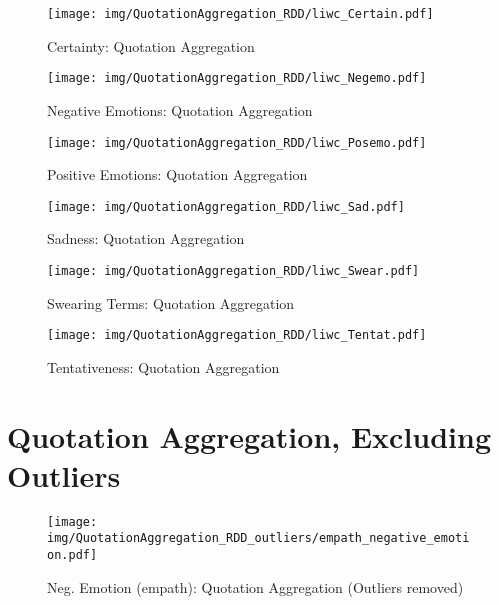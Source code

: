 \begin{figure}[h]\centering
\texttt{[image: img/QuotationAggregation\_RDD/liwc\_Certain.pdf]}
\caption{Certainty: Quotation Aggregation}
\label{fig: qa_Certainty}
\end{figure}

\begin{figure}[h]\centering
\texttt{[image: img/QuotationAggregation\_RDD/liwc\_Negemo.pdf]}
\caption{Negative Emotions: Quotation Aggregation}
\label{fig: qa_Negative Emotions}
\end{figure}

\begin{figure}[h]\centering
\texttt{[image: img/QuotationAggregation\_RDD/liwc\_Posemo.pdf]}
\caption{Positive Emotions: Quotation Aggregation}
\label{fig: qa_Positive Emotions}
\end{figure}

\begin{figure}[h]\centering
\texttt{[image: img/QuotationAggregation\_RDD/liwc\_Sad.pdf]}
\caption{Sadness: Quotation Aggregation}
\label{fig: qa_Sadness}
\end{figure}

\begin{figure}[h]\centering
\texttt{[image: img/QuotationAggregation\_RDD/liwc\_Swear.pdf]}
\caption{Swearing Terms: Quotation Aggregation}
\label{fig: qa_Swearing Terms}
\end{figure}

\begin{figure}[h]\centering
\texttt{[image: img/QuotationAggregation\_RDD/liwc\_Tentat.pdf]}
\caption{Tentativeness: Quotation Aggregation}
\label{fig: qa_Tentativeness}
\end{figure}

\clearpage
\pagebreak

\section{Quotation Aggregation, Excluding Outliers}

\begin{figure}[h]\centering
\texttt{[image: img/QuotationAggregation\_RDD\_outliers/empath\_negative\_emotion.pdf]}
\caption{Neg. Emotion (empath): Quotation Aggregation (Outliers removed)}
\label{fig: qa_Neg. Emotion (empath)}
\end{figure}

